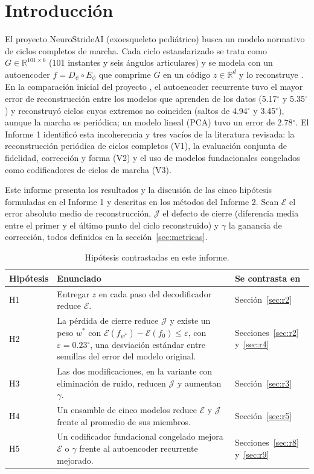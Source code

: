 \documentclass[11pt,a4paper]{article}
\newcommand{\gr}{$^{\circ}$}
\newcommand{\R}{\mathbb{R}}
\begin{document}
\section{Introducción}
\label{sec:intro}

El proyecto NeuroStrideAI (exoesqueleto pediátrico) busca un modelo normativo de ciclos completos de marcha. Cada ciclo estandarizado se trata como $G\in\R^{101\times 6}$ (101 instantes y seis ángulos articulares) y se modela con un autoencoder $f=D_\psi\circ E_\phi$ que comprime $G$ en un código $z\in\R^d$ y lo reconstruye \cite{hinton2006}. En la comparación inicial del proyecto \cite{neurostride2026}, el autoencoder recurrente tuvo el mayor error de reconstrucción entre los modelos que aprenden de los datos (5.17\gr{} y 5.35\gr) y reconstruyó ciclos cuyos extremos no coinciden (saltos de 4.94\gr{} y 3.45\gr), aunque la marcha es periódica; un modelo lineal (PCA) tuvo un error de 2.78\gr. El Informe 1 identificó esta incoherencia y tres vacíos de la literatura revisada: la reconstrucción periódica de ciclos completos (V1), la evaluación conjunta de fidelidad, corrección y forma (V2) y el uso de modelos fundacionales congelados como codificadores de ciclos de marcha (V3).

Este informe presenta los resultados y la discusión de las cinco hipótesis formuladas en el Informe 1 y descritas en los métodos del Informe 2. Sean $\mathcal E$ el error absoluto medio de reconstrucción, $\mathcal J$ el defecto de cierre (diferencia media entre el primer y el último punto del ciclo reconstruido) y $\gamma$ la ganancia de corrección, todos definidos en la sección~\ref{sec:metricas}.

\begin{table}[h]
\centering\footnotesize
\begin{tabularx}{\textwidth}{@{}l>{\raggedright\arraybackslash}X>{\raggedright\arraybackslash}p{2.6cm}@{}}
\toprule
Hipótesis & Enunciado & Se contrasta en \\
\midrule
H1 & Entregar $z$ en cada paso del decodificador reduce $\mathcal E$. & Sección~\ref{sec:r2} \\
H2 & La pérdida de cierre reduce $\mathcal J$ y existe un peso $w^\ast$ con $\mathcal E(f_{w^\ast})-\mathcal E(f_0)\le\varepsilon$, con $\varepsilon=0.23$\gr{}, una desviación estándar entre semillas del error del modelo original. & Secciones~\ref{sec:r2} y~\ref{sec:r4} \\
H3 & Las dos modificaciones, en la variante con eliminación de ruido, reducen $\mathcal J$ y aumentan $\gamma$. & Sección~\ref{sec:r3} \\
H4 & Un ensamble de cinco modelos reduce $\mathcal E$ y $\mathcal J$ frente al promedio de sus miembros. & Sección~\ref{sec:r5} \\
H5 & Un codificador fundacional congelado mejora $\mathcal E$ o $\gamma$ frente al autoencoder recurrente mejorado. & Secciones~\ref{sec:r8} y~\ref{sec:r9} \\
\bottomrule
\end{tabularx}
\caption{Hipótesis contrastadas en este informe.}
\label{tab:hip}
\end{table}
\end{document}
